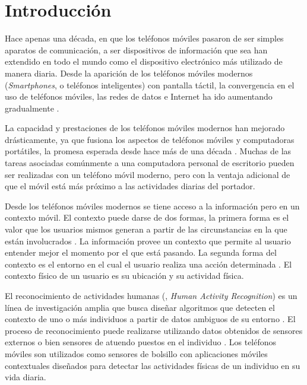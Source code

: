 
\chapter{Introducción}

\label{chap:introduccion}

Hace apenas una década, en que los teléfonos móviles pasaron de ser
simples aparatos de comunicación, a ser dispositivos de información
que sea han extendido en todo el mundo como el dispositivo electrónico
más utilizado de manera diaria. Desde la aparición de los teléfonos
móviles modernos (\emph{Smartphones}, o teléfonos inteligentes) con
pantalla táctil, la convergencia en el uso de teléfonos móviles, las
redes de datos e Internet ha ido aumentando gradualmente \cite{Fling2009}.

La capacidad y prestaciones de los teléfonos móviles modernos han
mejorado drásticamente, ya que fusiona los aspectos de teléfonos móviles
y computadoras portátiles, la promesa esperada desde hace más de una
década \cite{Tanenbaum2010}. Muchas de las tareas asociadas comúnmente
a una computadora personal de escritorio pueden ser realizadas con
un teléfono móvil moderno, pero con la ventaja adicional de que el
móvil está más próximo a las actividades diarias del portador.

Desde los teléfonos móviles modernos se tiene acceso a la información
pero en un contexto móvil. El contexto puede darse de dos formas,
la primera forma es el valor que los usuarios mismos generan a partir
de las circunstancias en la que están involucrados \cite{Fling2009}.
La información provee un contexto que permite al usuario entender
mejor el momento por el que está pasando. La segunda forma del contexto
es el entorno en el cual el usuario realiza una acción determinada
\cite{Fling2009}. El contexto físico de un usuario es su ubicación
y su actividad física. 

El reconocimiento de actividades humanas (, \emph{Human
Activity Recognition}) es un línea de investigación amplia que busca
diseñar algoritmos que detecten el contexto de uno o más individuos
a partir de datos ambiguos de su entorno \cite{Bao2004}. El proceso
de reconocimiento puede realizarse utilizando datos obtenidos de sensores
externos o bien sensores de atuendo puestos en el individuo \cite{LaraLabrador2013}.
Los teléfonos móviles son utilizados como sensores de bolsillo con
aplicaciones móviles contextuales diseñados para detectar las actividades
físicas de un individuo en su vida diaria. 

